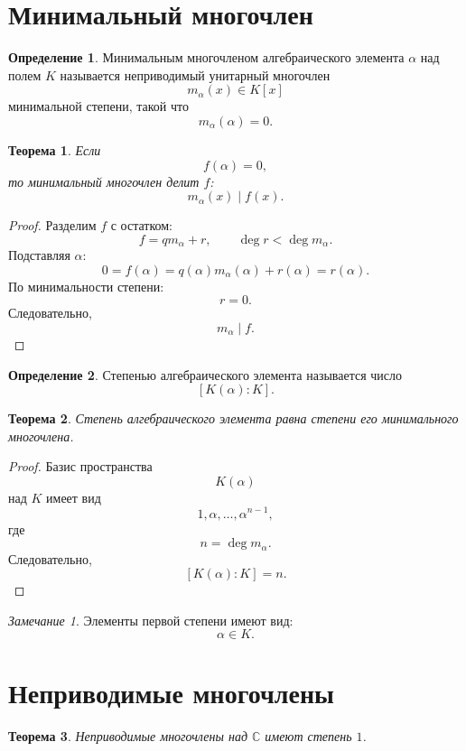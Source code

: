 \documentclass[12pt, a4paper]{article}
\newtheorem{theorem}{Теорема}
\theoremstyle{definition}
\newtheorem{definition}{Определение}
\theoremstyle{remark}
\newtheorem*{remark}{Замечание}
\renewcommand{\C}{\mathbb{C}}
\begin{document}
\section{Минимальный многочлен}

\begin{definition}
	Минимальным многочленом алгебраического элемента $\alpha$ над полем $K$
	называется неприводимый унитарный многочлен
	\[
	m_\alpha(x)\in K[x]
	\]
	минимальной степени, такой что
	\[
	m_\alpha(\alpha)=0.
	\]
\end{definition}

\begin{theorem}
	Если
	\[
	f(\alpha)=0,
	\]
	то минимальный многочлен делит $f$:
	\[
	m_\alpha(x)\mid f(x).
	\]
\end{theorem}

\begin{proof}
	Разделим $f$ с остатком:
	\[
	f=q m_\alpha+r,
	\qquad
	\deg r<\deg m_\alpha.
	\]
	Подставляя $\alpha$:
	\[
	0=f(\alpha)=q(\alpha)m_\alpha(\alpha)+r(\alpha)=r(\alpha).
	\]
	По минимальности степени:
	\[
	r=0.
	\]
	Следовательно,
	\[
	m_\alpha\mid f.
	\]
\end{proof}

\begin{definition}
	Степенью алгебраического элемента называется число
	\[
	[K(\alpha):K].
	\]
\end{definition}

\begin{theorem}
	Степень алгебраического элемента равна степени его минимального многочлена.
\end{theorem}

\begin{proof}
	Базис пространства
	\[
	K(\alpha)
	\]
	над $K$ имеет вид
	\[
	1,\alpha,\dots,\alpha^{n-1},
	\]
	где
	\[
	n=\deg m_\alpha.
	\]
	Следовательно,
	\[
	[K(\alpha):K]=n.
	\]
\end{proof}

\begin{remark}
	Элементы первой степени имеют вид:
	\[
	\alpha\in K.
	\]
\end{remark}

\section{Неприводимые многочлены}

\begin{theorem}
	Неприводимые многочлены над $\C$ имеют степень $1$.
\end{theorem}
\end{document}
